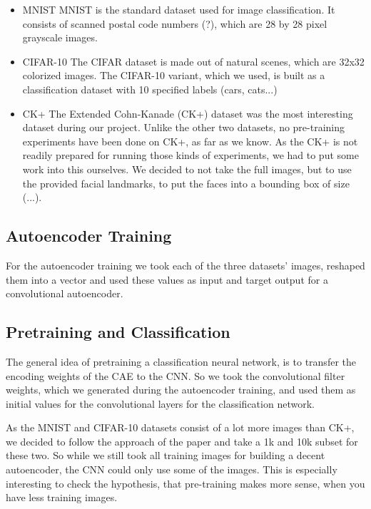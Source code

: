 \documentclass[draft]{article}
\begin{document}
    \begin{itemize}
    \item{MNIST}
        MNIST is the standard dataset used for image classification. It consists of scanned postal code numbers (?),
        which are 28 by 28 pixel grayscale images.
    \item{CIFAR-10}
        The CIFAR dataset is made out of natural scenes, which are 32x32 colorized images. The CIFAR-10 variant,
        which we used, is built as a classification dataset with 10 specified labels (cars, cats...)
    \item{CK+}
        The Extended Cohn-Kanade (CK+) dataset was the most interesting dataset during our project. Unlike the other
        two datasets, no pre-training experiments have been done on CK+, as far as we know.
        As the CK+ is not readily prepared for running those kinds of experiments, we had to put some work into this ourselves.
        We decided to not take the full images, but to use the provided facial landmarks, to put the faces
        into a bounding box of size (...).
         
    \end{itemize}

  \subsection{Autoencoder Training}
  For the autoencoder training we took each of the three datasets' images, reshaped them into a vector and used
  these values as input and target output for a convolutional autoencoder.
  \subsection{Pretraining and Classification}
  The general idea of pretraining a classification neural network, is to transfer the encoding weights of
  the CAE to the CNN. So we took the convolutional filter weights, which we generated during the autoencoder training,
  and used them as initial values for the convolutional layers for the classification network.

  As the MNIST and CIFAR-10 datasets consist of a lot more images than CK+, we decided to follow the approach of the paper
  and take a 1k and 10k subset for these two. So while we still took all training images for building a decent autoencoder,
  the CNN could only use some of the images. This is especially interesting to check the hypothesis, that pre-training makes
  more sense, when you have less training images.
\end{document}
